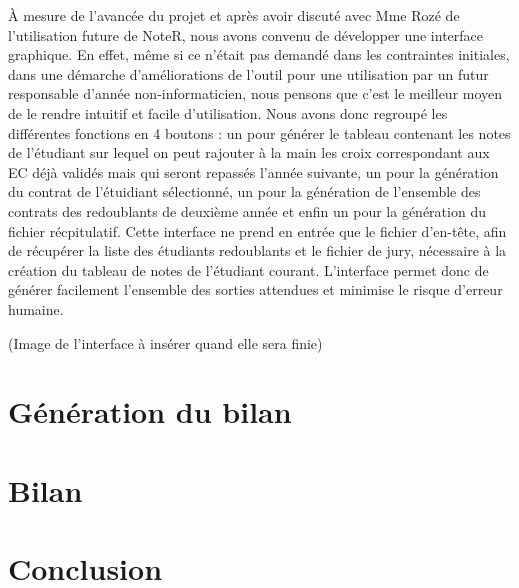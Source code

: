 \documentclass[a4paper,11pt]{article}
\begin{document}
    À mesure de l'avancée du projet et après avoir discuté avec Mme Rozé de l'utilisation future de NoteR, nous avons convenu de développer une interface graphique. En effet, même si ce n'était pas demandé dans les contraintes initiales,  dans une démarche d'améliorations de l'outil pour une utilisation par un futur responsable d'année non-informaticien, nous pensons que c'est le meilleur moyen de le rendre intuitif et facile d'utilisation. Nous avons donc regroupé les différentes fonctions en 4 boutons : un  pour générer le tableau contenant les notes de l'étudiant sur lequel on peut rajouter à la main les croix correspondant aux EC déjà validés mais qui seront repassés l'année suivante, un pour la génération du contrat de l'étuidiant sélectionné, un pour la génération de l'ensemble des contrats des redoublants de deuxième année et enfin un pour la génération du fichier récpitulatif. Cette interface ne prend en entrée que le fichier d'en-tête, afin de récupérer la liste des étudiants redoublants et le fichier de jury, nécessaire à la création du tableau de notes de l'étudiant courant. L'interface permet donc de générer facilement l'ensemble des sorties attendues et minimise le risque d'erreur humaine.

    (Image de l'interface à insérer quand elle sera finie)

\section{Génération du bilan }
 

\section{Bilan }
  

\section*{Conclusion}
  


\end{document}
